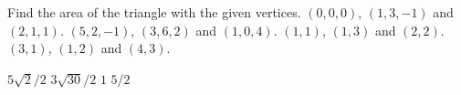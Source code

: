 
\begin{Exercise}[
name={},
title={}, 
difficulty=0,
origin={\cite{GHC}}]
Find the area of the triangle with the given vertices.
\Question $(0,0,0)$, $(1,3,-1)$ and $(2,1,1)$.
\Question $(5,2,-1)$, $(3,6,2)$ and $(1,0,4)$.
\Question $(1,1)$, $(1,3)$ and $(2,2)$.
\Question $(3,1)$, $(1,2)$ and $(4,3)$.
\end{Exercise}

\begin{Answer}
\Question $5\sqrt{2}/2$
\Question $3\sqrt{30}/2$
\Question $1$
\Question $5/2$
\end{Answer}
